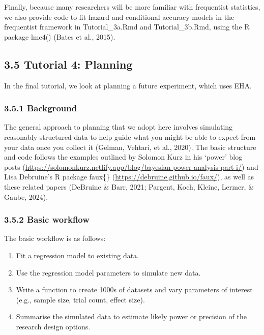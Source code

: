 \documentclass[
  man, donotrepeattitle,floatsintext]{apa6}
\providecommand{\tightlist}{%
  \setlength{\itemsep}{0pt}\setlength{\parskip}{0pt}}
\begin{document}
Finally, because many researchers will be more familiar with frequentist statistics, we also provide code to fit hazard and conditional accuracy models in the frequentist framework in Tutorial\_3a.Rmd and Tutorial\_3b.Rmd, using the R package lme4() (Bates et al., 2015).

\subsection{3.5 Tutorial 4: Planning}\label{tutorial-4-planning}

In the final tutorial, we look at planning a future experiment, which uses EHA.

\subsubsection{3.5.1 Background}\label{background}

The general approach to planning that we adopt here involves simulating reasonably structured data to help guide what you might be able to expect from your data once you collect it (Gelman, Vehtari, et al., 2020).
The basic structure and code follows the examples outlined by Solomon Kurz in his `power' blog posts (\url{https://solomonkurz.netlify.app/blog/bayesian-power-analysis-part-i/}) and Lisa Debruine's R package faux\{\} (\url{https://debruine.github.io/faux/}), as well as these related papers (DeBruine \& Barr, 2021; Pargent, Koch, Kleine, Lermer, \& Gaube, 2024).

\subsubsection{3.5.2 Basic workflow}\label{basic-workflow}

The basic workflow is as follows:

\begin{enumerate}
\def\labelenumi{\arabic{enumi}.}
\tightlist
\item
  Fit a regression model to existing data.
\item
  Use the regression model parameters to simulate new data.
\item
  Write a function to create 1000s of datasets and vary parameters of interest (e.g., sample size, trial count, effect size).
\item
  Summarise the simulated data to estimate likely power or precision of the research design options.
\end{enumerate}
\end{document}
